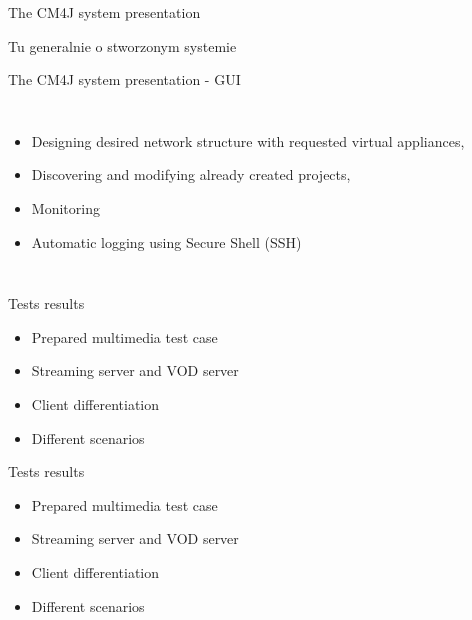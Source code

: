 \documentclass{beamer}
\begin{document}
	\begin{frame}{The CM4J system presentation}

		Tu generalnie o stworzonym systemie

	\end{frame}

	\begin{frame}{The CM4J system presentation - GUI}

		\begin{columns}[c]
		\column{1.5in}
			\begin{itemize}
				\item Designing desired network structure with requested virtual appliances,
				\item Discovering and modifying already created projects,
				\item Monitoring
				\item Automatic logging using Secure Shell (SSH)
			\end{itemize}
		\column{1.5in}
		\end{columns}

	\end{frame}

	\begin{frame}{Tests results}

		
		\begin{itemize}
			\item Prepared multimedia test case
			\item Streaming server and VOD server
			\item Client differentiation
			\item Different scenarios
		\end{itemize}

	\end{frame}

	\begin{frame}{Tests results}

		\begin{itemize}
			\item Prepared multimedia test case
			\item Streaming server and VOD server
			\item Client differentiation
			\item Different scenarios
		\end{itemize}

	\end{frame}
\end{document}
